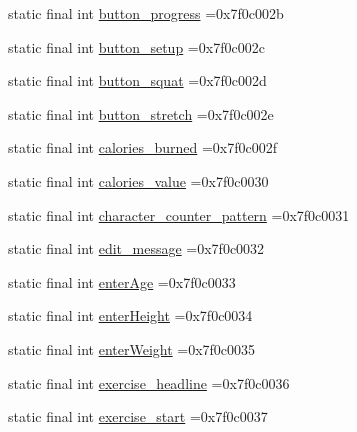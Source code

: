 \begin{DoxyCompactItemize}
\item 
static final int \mbox{\hyperlink{classcom_1_1example_1_1trainawearapplication_1_1_r_1_1string_a2417446d788d1ad933315118b3433979}{button\+\_\+progress}} =0x7f0c002b
\item 
static final int \mbox{\hyperlink{classcom_1_1example_1_1trainawearapplication_1_1_r_1_1string_a1eefbc6aa02eec1e0f90f4d4b3116338}{button\+\_\+setup}} =0x7f0c002c
\item 
static final int \mbox{\hyperlink{classcom_1_1example_1_1trainawearapplication_1_1_r_1_1string_ae834fdc6244fca35b81d26141ef9af17}{button\+\_\+squat}} =0x7f0c002d
\item 
static final int \mbox{\hyperlink{classcom_1_1example_1_1trainawearapplication_1_1_r_1_1string_a0bd569f14d07d821913e796d3e55117a}{button\+\_\+stretch}} =0x7f0c002e
\item 
static final int \mbox{\hyperlink{classcom_1_1example_1_1trainawearapplication_1_1_r_1_1string_a69d18f41ce157790ce18988222b58f8b}{calories\+\_\+burned}} =0x7f0c002f
\item 
static final int \mbox{\hyperlink{classcom_1_1example_1_1trainawearapplication_1_1_r_1_1string_ac53a8d321b4b40b76ec3979fcb1642a5}{calories\+\_\+value}} =0x7f0c0030
\item 
static final int \mbox{\hyperlink{classcom_1_1example_1_1trainawearapplication_1_1_r_1_1string_a8f66298659df3cafdab3c61ca39673c5}{character\+\_\+counter\+\_\+pattern}} =0x7f0c0031
\item 
static final int \mbox{\hyperlink{classcom_1_1example_1_1trainawearapplication_1_1_r_1_1string_a87bc9cc551247b5cd6572e5556128aad}{edit\+\_\+message}} =0x7f0c0032
\item 
static final int \mbox{\hyperlink{classcom_1_1example_1_1trainawearapplication_1_1_r_1_1string_a793f755501dc4aa299cc550ae47b4172}{enter\+Age}} =0x7f0c0033
\item 
static final int \mbox{\hyperlink{classcom_1_1example_1_1trainawearapplication_1_1_r_1_1string_af14faf676dc1ac3b9491e7833034ad43}{enter\+Height}} =0x7f0c0034
\item 
static final int \mbox{\hyperlink{classcom_1_1example_1_1trainawearapplication_1_1_r_1_1string_ad5ba9959ce139cff5679a3a1e42ed360}{enter\+Weight}} =0x7f0c0035
\item 
static final int \mbox{\hyperlink{classcom_1_1example_1_1trainawearapplication_1_1_r_1_1string_a9bd7fc4fe24da43adb82d20f0bf32165}{exercise\+\_\+headline}} =0x7f0c0036
\item 
static final int \mbox{\hyperlink{classcom_1_1example_1_1trainawearapplication_1_1_r_1_1string_a773fdecce2141f9ef4fad5420ced3c96}{exercise\+\_\+start}} =0x7f0c0037

\end{DoxyCompactItemize}

